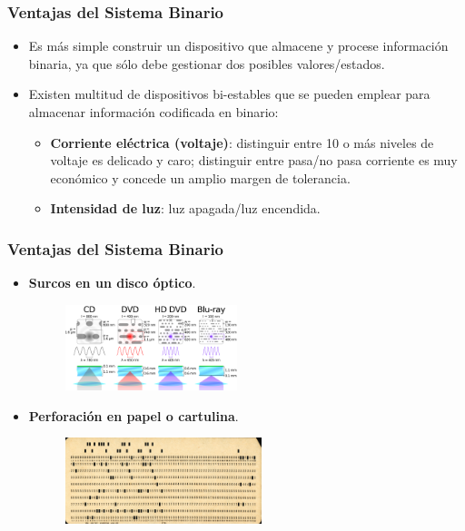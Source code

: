 \documentclass{beamer}
\begin{document}
\begin{frame}[fragile]\frametitle{Ventajas del Sistema Binario}
\begin{itemize}
	\item Es más simple construir un dispositivo que almacene y procese información binaria, ya que sólo debe gestionar dos posibles valores/estados.

\item Existen multitud de dispositivos bi-estables que se pueden emplear para almacenar información codificada en binario:
\begin{itemize}
	\item \textbf{Corriente eléctrica (voltaje)}: distinguir entre 10 o más niveles de voltaje es delicado y caro; distinguir entre pasa/no pasa corriente es muy económico y concede un amplio margen de tolerancia.
	\item \textbf{Intensidad de luz}: luz apagada/luz encendida.
\end{itemize}
\end{itemize}
\end{frame}
\begin{frame}[fragile]\frametitle{Ventajas del Sistema Binario}
\begin{itemize}
	\item \textbf{Surcos en un disco óptico}.
	\begin{figure}
	\begin{center}
	\includegraphics[height=2.5cm]{figs/Discos-opticos.png}\hspace{1cm}	
	\end{center}
	\end{figure}
	\item \textbf{Perforación en papel o cartulina}.
	\begin{figure}
	\begin{center}
	\includegraphics[height=2.5cm]{figs/Used_Punchcard_(5151286161).jpg}\hspace{1cm}	
	\end{center}
	\end{figure}
\end{itemize}
\end{frame}
\end{document}
